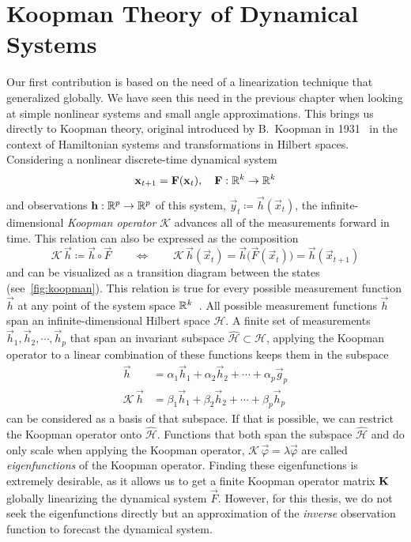 \section{Koopman Theory of Dynamical Systems}
	Our first contribution is based on the need of a linearization technique that generalized globally. We have seen this need in the previous chapter when looking at simple nonlinear systems and small angle approximations. This brings us directly to Koopman theory, original introduced by B.~Koopman in 1931~\cite{koopmanHamiltonianSystemsTransformation1931} in the context of Hamiltonian systems and transformations in Hilbert spaces. Considering a nonlinear discrete-time dynamical system
	\begin{equation*}
		\boldsymbol{\mathrm{x}}_{t + 1} = \boldsymbol{\mathrm{F}}(\boldsymbol{\mathrm{x}}_t),\quad \boldsymbol{\mathrm{F}} : \mathbb{R}^k \to \mathbb{R}^k
	\end{equation*}
	and observations \( \boldsymbol{\mathrm{h}} : \mathbb{R}^p \to \mathbb{R}^p \) of this system, \ie \( \vec{y}_t \coloneqq \vec{h}(\vec{x}_t) \), the infinite-dimensional \emph{Koopman operator} \(\mathcal{K}\) advances all of the measurements forward in time. This relation can also be expressed as the composition
	\begin{equation*}
		\mathcal{K} \, \vec{h} \coloneqq \vec{h} \circ \vec{F} \qquad\iff\qquad \mathcal{K} \, \vec{h}(\vec{x}_t) = \vec{h}\big( \vec{F}(\vec{x}_t) \big) = \vec{h}(\vec{x}_{t + 1})
	\end{equation*}
	and can be visualized as a transition diagram between the states (see~\autoref{fig:koopman}). This relation is true for every possible measurement function \( \vec{h} \) at any point of the system space \( \mathbb{R}^k \)~\cite{bruntonKoopmanInvariantSubspaces2016}. All possible measurement functions \( \vec{h} \) span an infinite-dimensional Hilbert space \( \mathcal{H} \). A finite set of measurements \( \vec{h}_1, \vec{h}_2, \cdots, \vec{h}_p \) that span an invariant subspace \( \hat{\mathcal{H}} \subset \mathcal{H} \), \ie applying the Koopman operator to a linear combination of these functions keeps them in the subspace
	\begin{align*}
		\vec{h} &= \alpha_1 \vec{h}_1 + \alpha_2 \vec{h}_2 + \cdots + \alpha_p \vec{g}_p \\
		\mathcal{K} \, \vec{h} &= \beta_1 \vec{h}_1 + \beta_2 \vec{h}_2 + \cdots + \beta_p \vec{h}_p
	\end{align*}
	can be considered as a basis of that subspace. If that is possible, we can restrict the Koopman operator onto \( \hat{\mathcal{H}} \). Functions that both span the subspace \(\hat{\mathcal{H}}\) and do only scale when applying the Koopman operator, \ie \( \mathcal{K} \, \vec{\varphi} = \lambda \vec{\varphi} \) are called \emph{eigenfunctions} of the Koopman operator. Finding these eigenfunctions is extremely desirable, as it allows us to get a finite Koopman operator matrix \( \boldsymbol{\mathrm{K}} \) globally linearizing the dynamical system \( \vec{F} \). However, for this thesis, we do not seek the eigenfunctions directly but an approximation of the \emph{inverse} observation function to forecast the dynamical system.

